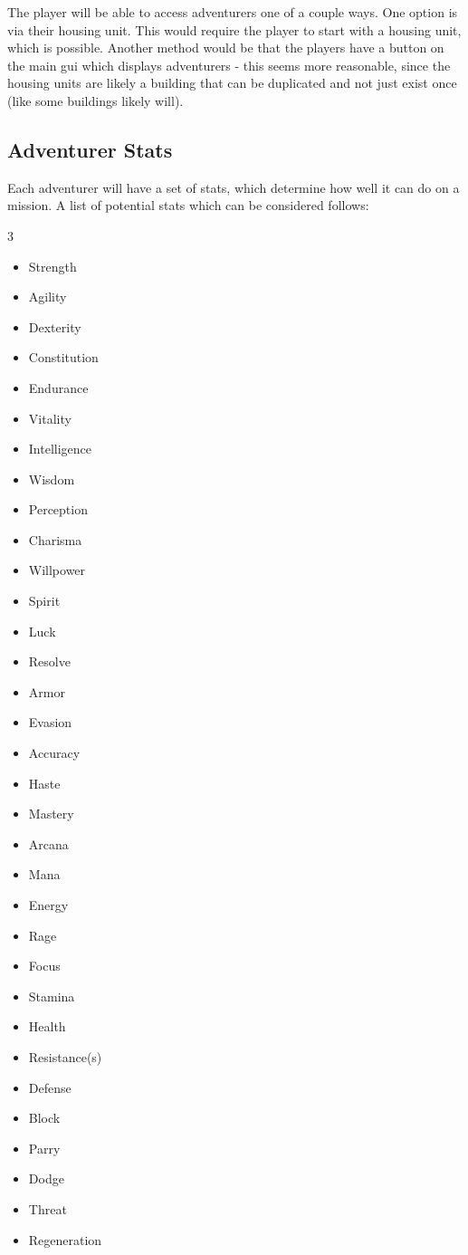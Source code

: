 The player will be able to access adventurers one of a couple ways. One option is via their housing unit. This would require the player to start with a housing unit, which is possible. Another method would be that the players have a button on the main gui which displays adventurers - this seems more reasonable, since the housing units are likely a building that can be duplicated and not just exist once (like some buildings likely will). 

\subsection{Adventurer Stats}

Each adventurer will have a set of stats, which determine how well it can do on a mission. A list of potential stats which can be considered follows:

\begin{multicols}{3}
	\begin{itemize}[noitemsep, topsep=0pt]
		\item Strength
		\item Agility
		\item Dexterity
		\item Constitution
		\item Endurance
		\item Vitality
		\item Intelligence
		\item Wisdom
		\item Perception
		\item Charisma
		\item Willpower
		\item Spirit
		\item Luck
		\item Resolve
		\item Armor
		\item Evasion
		\item Accuracy
		\item Haste
		\item Mastery
		\item Arcana
		\item Mana
		\item Energy
		\item Rage
		\item Focus
		\item Stamina
		\item Health
		\item Resistance(s)
		\item Defense
		\item Block
		\item Parry
		\item Dodge
		\item Threat
		\item Regeneration
	\end{itemize}
\end{multicols}

